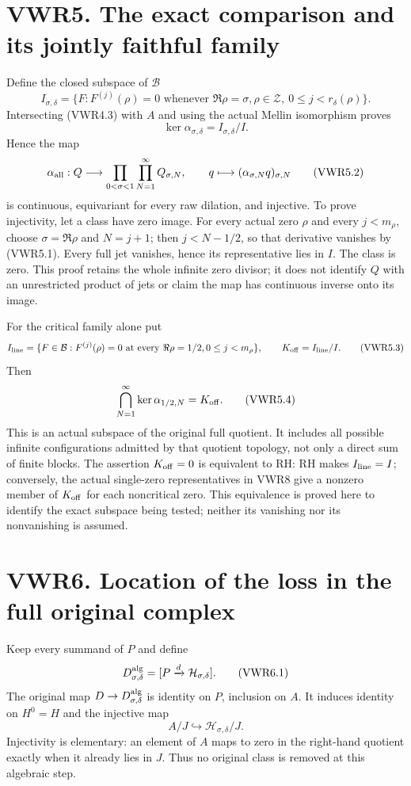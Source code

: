 \section{VWR5. The exact comparison and its jointly faithful
family}\label{vwr5.-the-exact-comparison-and-its-jointly-faithful-family}

Define the closed subspace of \(\mathcal B\) \[
I_{\sigma,\delta}=\{F:F^{(j)}(\rho)=0\text{ whenever }\Re\rho=\sigma,
 \rho\in\mathscr Z,\ 0\le j<r_\delta(\rho)\}.
\] Intersecting (VWR4.3) with \(A\) and using the actual Mellin
isomorphism proves \[
\ker\alpha_{\sigma,\delta}=I_{\sigma,\delta}/I.
\tag{VWR5.1}
\] Hence the map \[
\alpha_{\rm all}:Q\longrightarrow
\prod_{0<\sigma<1}\prod_{N=1}^{\infty}Q_{\sigma,N},
\qquad q\longmapsto(\alpha_{\sigma,N}q)_{\sigma,N}
\tag{VWR5.2}
\] is continuous, equivariant for every raw dilation, and injective. To
prove injectivity, let a class have zero image. For every actual zero
\(\rho\) and every \(j<m_\rho\), choose \(\sigma=\Re\rho\) and
\(N=j+1\); then \(j<N-1/2\), so that derivative vanishes by (VWR5.1).
Every full jet vanishes, hence its representative lies in \(I\). The
class is zero. This proof retains the whole infinite zero divisor; it
does not identify \(Q\) with an unrestricted product of jets or claim
the map has continuous inverse onto its image.

For the critical family alone put \[
I_{\rm line}=\{F\in\mathcal B:F^{(j)}(\rho)=0\text{ at every }\Re\rho=1/2,
 0\le j<m_\rho\},\qquad K_{\rm off}=I_{\rm line}/I.
\tag{VWR5.3}
\] Then \[
\bigcap_{N=1}^{\infty}\ker\alpha_{1/2,N}=K_{\rm off}.
\tag{VWR5.4}
\] This is an actual subspace of the original full quotient. It includes
all possible infinite configurations admitted by that quotient topology,
not only a direct sum of finite blocks. The assertion \(K_{\rm off}=0\)
is equivalent to RH: RH makes \(I_{\rm line}=I\); conversely, the actual
single-zero representatives in VWR8 give a nonzero member of
\(K_{\rm off}\) for each noncritical zero. This equivalence is proved
here to identify the exact subspace being tested; neither its vanishing
nor its nonvanishing is assumed.

\section{VWR6. Location of the loss in the full original
complex}\label{vwr6.-location-of-the-loss-in-the-full-original-complex}

Keep every summand of \(P\) and define \[
D_{\sigma,\delta}^{\rm alg}=[P\xrightarrow d\mathcal H_{\sigma,\delta}].
\tag{VWR6.1}
\] The original map \(D\to D_{\sigma,\delta}^{\rm alg}\) is identity on
\(P\), inclusion on \(A\). It induces identity on \(H^0=H\) and the
injective map \[
A/J\hookrightarrow\mathcal H_{\sigma,\delta}/J.
\tag{VWR6.2}
\] Injectivity is elementary: an element of \(A\) maps to zero in the
right-hand quotient exactly when it already lies in \(J\). Thus no
original class is removed at this algebraic step.

